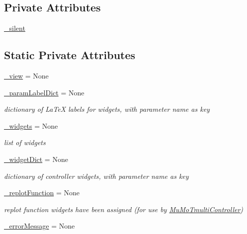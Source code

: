 \subsection*{Private Attributes}
\begin{DoxyCompactItemize}
\item 
\hyperlink{class_mu_mo_t_1_1_mu_mo_tcontroller_a909146a3c119c927727c7d533042b184}{\+\_\+silent}
\end{DoxyCompactItemize}
\subsection*{Static Private Attributes}
\begin{DoxyCompactItemize}
\item 
\hyperlink{class_mu_mo_t_1_1_mu_mo_tcontroller_a27dd8543b5188cdfe40f622d267fe2c5}{\+\_\+view} = None
\item 
\hyperlink{class_mu_mo_t_1_1_mu_mo_tcontroller_a13bcda33e0e971cf4ad2710945226add}{\+\_\+param\+Label\+Dict} = None
\begin{DoxyCompactList}\small\item\em dictionary of La\+TeX labels for widgets, with parameter name as key \end{DoxyCompactList}\item 
\hyperlink{class_mu_mo_t_1_1_mu_mo_tcontroller_a397d0ee37a222317a1bab7deb1270a13}{\+\_\+widgets} = None
\begin{DoxyCompactList}\small\item\em list of widgets \end{DoxyCompactList}\item 
\hyperlink{class_mu_mo_t_1_1_mu_mo_tcontroller_a76e960ae74fc597cd22f7132507eaa20}{\+\_\+widget\+Dict} = None
\begin{DoxyCompactList}\small\item\em dictionary of controller widgets, with parameter name as key \end{DoxyCompactList}\item 
\hyperlink{class_mu_mo_t_1_1_mu_mo_tcontroller_a04e66f2b7e3c67b0e96f318acbfa7f0e}{\+\_\+replot\+Function} = None
\begin{DoxyCompactList}\small\item\em replot function widgets have been assigned (for use by \hyperlink{class_mu_mo_t_1_1_mu_mo_tmulti_controller}{Mu\+Mo\+Tmulti\+Controller}) \end{DoxyCompactList}\item 
\hyperlink{class_mu_mo_t_1_1_mu_mo_tcontroller_afb9cc1f1f0c08393b454f526842425cc}{\+\_\+error\+Message} = None

\end{DoxyCompactItemize}
